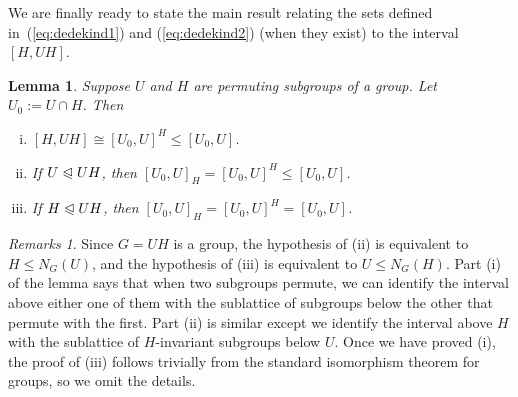 \documentclass[cm,dissertation,actual,final]{uhthesis}
\theoremstyle{plain}
\newtheorem{lemma}[theorem]{Lemma}
\theoremstyle{definition}
\theoremstyle{remark}
\newtheorem*{remarks}{Remarks}
\numberwithin{theorem}{section}
\numberwithin{claim}{chapter}
\numberwithin{equation}{section}
\numberwithin{conjecture}{chapter}
\newcommand{\<}{\ensuremath{\langle}}
\renewcommand{\>}{\ensuremath{\rangle}}
\renewcommand{\leq}{\ensuremath{\leqslant}}
\newcommand{\subnormal}{\ensuremath{\trianglelefteqslant}}
\newcommand{\0}{\ensuremath{\mathbf{0}}}
\newcommand{\1}{\ensuremath{\mathbf{1}}}
\newcommand{\2}{\ensuremath{\mathbf{2}}}
\newcommand{\3}{\ensuremath{\mathbf{3}}}
\newcommand{\4}{\ensuremath{\mathbf{4}}}
\newcommand{\5}{\ensuremath{\mathbf{5}}}
\begin{document}
We are finally ready to state the main result relating the sets defined
in~(\ref{eq:dedekind1}) and (\ref{eq:dedekind2}) (when they
exist) to the interval $[H, UH]$.
\begin{lemma}
  \label{lemma-wjd-4}
Suppose $U$ and $H$ are permuting subgroups of a group. %
Let $U_0 := U\cap H$.  Then
\begin{enumerate}[(i)]
\item $[H, UH]  \cong  [U_0, U]^H \leq [U_0, U]$.
\item If $U \subnormal UH$, then  $[U_0, U]_H  = [U_0, U]^H \leq [U_0, U]$.
\item If $H \subnormal UH$,  then  $[U_0, U]_H  = [U_0, U]^H = [U_0, U]$.
\end{enumerate}
\end{lemma}
\begin{remarks}
Since $G=UH$ is a group, the hypothesis of (ii) is equivalent to
$H\leq N_G(U)$, and the hypothesis of (iii) is equivalent to $U\leq N_G(H)$.
Part (i) of the lemma says that when two subgroups permute, we can
identify the interval above either one of them with the sublattice of
subgroups below the other that permute with the first.
Part (ii) is similar except we identify the interval above $H$ with
the  sublattice of $H$-invariant subgroups below $U$.  Once we have proved (i), the
proof of (iii) follows trivially from the standard isomorphism theorem for
groups, so we omit the details.
\end{remarks}
\end{document}
